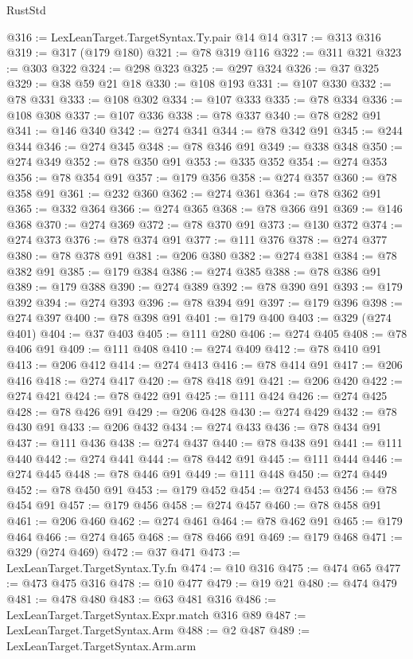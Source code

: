 \begin{lexlean}{RustStd}
\begin{coremodule}
@316 := LexLeanTarget.TargetSyntax.Ty.pair @14 @14
@317 := @313 @316
@319 := @317 (@179 @180)
@321 := @78 @319 @116
@322 := @311 @321
@323 := @303 @322
@324 := @298 @323
@325 := @297 @324
@326 := @37 @325
@329 := @38 @59 @21 @18
@330 := @108 @193
@331 := @107 @330
@332 := @78 @331
@333 := @108 @302
@334 := @107 @333
@335 := @78 @334
@336 := @108 @308
@337 := @107 @336
@338 := @78 @337
@340 := @78 @282 @91
@341 := @146 @340
@342 := @274 @341
@344 := @78 @342 @91
@345 := @244 @344
@346 := @274 @345
@348 := @78 @346 @91
@349 := @338 @348
@350 := @274 @349
@352 := @78 @350 @91
@353 := @335 @352
@354 := @274 @353
@356 := @78 @354 @91
@357 := @179 @356
@358 := @274 @357
@360 := @78 @358 @91
@361 := @232 @360
@362 := @274 @361
@364 := @78 @362 @91
@365 := @332 @364
@366 := @274 @365
@368 := @78 @366 @91
@369 := @146 @368
@370 := @274 @369
@372 := @78 @370 @91
@373 := @130 @372
@374 := @274 @373
@376 := @78 @374 @91
@377 := @111 @376
@378 := @274 @377
@380 := @78 @378 @91
@381 := @206 @380
@382 := @274 @381
@384 := @78 @382 @91
@385 := @179 @384
@386 := @274 @385
@388 := @78 @386 @91
@389 := @179 @388
@390 := @274 @389
@392 := @78 @390 @91
@393 := @179 @392
@394 := @274 @393
@396 := @78 @394 @91
@397 := @179 @396
@398 := @274 @397
@400 := @78 @398 @91
@401 := @179 @400
@403 := @329 (@274 @401)
@404 := @37 @403
@405 := @111 @280
@406 := @274 @405
@408 := @78 @406 @91
@409 := @111 @408
@410 := @274 @409
@412 := @78 @410 @91
@413 := @206 @412
@414 := @274 @413
@416 := @78 @414 @91
@417 := @206 @416
@418 := @274 @417
@420 := @78 @418 @91
@421 := @206 @420
@422 := @274 @421
@424 := @78 @422 @91
@425 := @111 @424
@426 := @274 @425
@428 := @78 @426 @91
@429 := @206 @428
@430 := @274 @429
@432 := @78 @430 @91
@433 := @206 @432
@434 := @274 @433
@436 := @78 @434 @91
@437 := @111 @436
@438 := @274 @437
@440 := @78 @438 @91
@441 := @111 @440
@442 := @274 @441
@444 := @78 @442 @91
@445 := @111 @444
@446 := @274 @445
@448 := @78 @446 @91
@449 := @111 @448
@450 := @274 @449
@452 := @78 @450 @91
@453 := @179 @452
@454 := @274 @453
@456 := @78 @454 @91
@457 := @179 @456
@458 := @274 @457
@460 := @78 @458 @91
@461 := @206 @460
@462 := @274 @461
@464 := @78 @462 @91
@465 := @179 @464
@466 := @274 @465
@468 := @78 @466 @91
@469 := @179 @468
@471 := @329 (@274 @469)
@472 := @37 @471
@473 := LexLeanTarget.TargetSyntax.Ty.fn
@474 := @10 @316
@475 := @474 @65
@477 := @473 @475 @316
@478 := @10 @477
@479 := @19 @21
@480 := @474 @479
@481 := @478 @480
@483 := @63 @481 @316
@486 := LexLeanTarget.TargetSyntax.Expr.match @316 @89
@487 := LexLeanTarget.TargetSyntax.Arm
@488 := @2 @487
@489 := LexLeanTarget.TargetSyntax.Arm.arm

\end{coremodule}
\end{lexlean}
